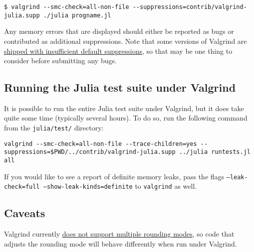 \begin{lstlisting}
$ valgrind --smc-check=all-non-file --suppressions=contrib/valgrind-julia.supp ./julia progname.jl
\end{lstlisting}



Any memory errors that are displayed should either be reported as bugs or contributed as additional suppressions.  Note that some versions of Valgrind are \href{https://github.com/JuliaLang/julia/issues/8314\#issuecomment-55766210}{shipped with insufficient default suppressions}, so that may be one thing to consider before submitting any bugs.



\hypertarget{10173787738831416739}{}


\subsection{Running the Julia test suite under Valgrind}



It is possible to run the entire Julia test suite under Valgrind, but it does take quite some time (typically several hours).  To do so, run the following command from the \texttt{julia/test/} directory:




\begin{lstlisting}
valgrind --smc-check=all-non-file --trace-children=yes --suppressions=$PWD/../contrib/valgrind-julia.supp ../julia runtests.jl all
\end{lstlisting}



If you would like to see a report of {\textquotedbl}definite{\textquotedbl} memory leaks, pass the flags \texttt{--leak-check=full --show-leak-kinds=definite} to \texttt{valgrind} as well.



\hypertarget{11463604234155946056}{}


\subsection{Caveats}



Valgrind currently \href{https://bugs.kde.org/show\_bug.cgi?id=136779}{does not support multiple rounding modes}, so code that adjusts the rounding mode will behave differently when run under Valgrind.




